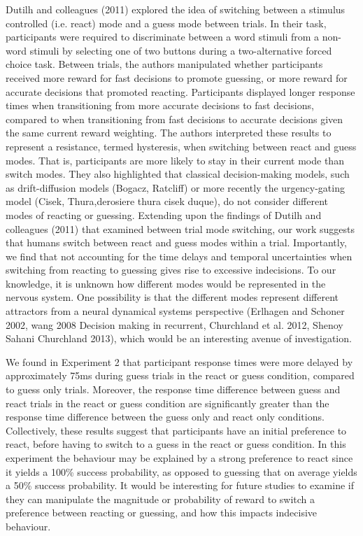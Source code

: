 \documentclass[12pt,letterpaper]{article}
\begin{document}
Dutilh and colleagues (2011) explored the idea of switching between a stimulus controlled (i.e. react) mode and a guess mode between trials. In their task, participants were required to discriminate between a word stimuli from a non-word stimuli by selecting one of two buttons during a two-alternative forced choice task. Between trials, the authors manipulated whether participants received more reward for fast decisions to promote guessing, or more reward for accurate decisions that promoted reacting. Participants displayed longer response times when transitioning from more accurate decisions to fast decisions, compared to when transitioning from fast decisions to accurate decisions given the same current reward weighting. The authors interpreted these results to represent a resistance, termed hysteresis, when switching between react and guess modes. That is, participants are more likely to stay in their current mode than switch modes. They also highlighted that classical decision-making models, such as drift-diffusion models (Bogacz, Ratcliff) or more recently the urgency-gating model (Cisek, Thura,derosiere thura cisek duque), do not consider different modes of reacting or guessing. Extending upon the findings of Dutilh and colleagues (2011) that examined between trial mode switching, our work suggests that humans switch between react and guess modes within a trial. Importantly, we find that not accounting for the time delays and temporal uncertainties when switching from reacting to guessing gives rise to excessive indecisions. To our knowledge, it is unknown how different modes would be represented in the nervous system. One possibility is that the different modes represent different attractors from a neural dynamical systems perspective (Erlhagen and Schoner 2002, wang 2008 Decision making in recurrent, Churchland et al. 2012, Shenoy Sahani Churchland 2013), which would be an interesting avenue of investigation.

We found in Experiment 2 that participant response times were more delayed by approximately 75ms during guess trials in the react or guess condition, compared to guess only trials. Moreover, the response time difference between guess and react trials in the react or guess condition are significantly greater than the response time difference between the guess only and react only conditions. Collectively, these results suggest that participants have an initial preference to react, before having to switch to a guess in the react or guess condition. In this experiment the behaviour may be explained by a strong preference to react since it yields a 100\% success probability, as opposed to guessing that on average yields a 50\% success probability. It would be interesting for future studies to examine if they can manipulate the magnitude or probability of reward to switch a preference between reacting or guessing, and how this impacts indecisive behaviour.
\end{document}
